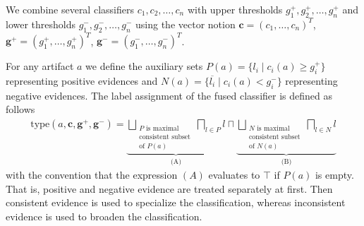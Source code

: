 

We combine several classifiers $c_1,c_2,\dots, c_n$ with upper thresholds $g_1^+, g_2^+, \dots, g_n^+$ and lower thresholds $g_1^-, g_2^-, \dots, g_n^-$ using the vector notion $\mathbf c = (c_1,\dots,c_n)^T$, $\mathbf g^+=(g_1^+,\dots, g_n^+)^T$, $\mathbf g^-=(g_1^-,\dots,g_n^-)^T$. 

For any artifact $a$ we define the auxiliary sets
$P(a) = \{l_i\mid c_i(a) \geq g_i^+\}$ representing positive evidences and
$N(a) = \{\overline{l_i}\mid c_i(a) < g_i^-\}$ representing negative evidences.
The label assignment of the fused classifier is defined as follows
\begin{gather*}
    \mathrm{type}(a,\mathbf c, \mathbf g^+,\mathbf g^-) = 
    \underbrace{
    \bigsqcup\limits_{\substack{\text{$P$ is maximal}\\\text{consistent subset}\\\text{of $P(a)$}}} \bigsqcap\limits_{l \in P} l}_{\text{(A)}}
    \sqcap
    \underbrace{
    \bigsqcup\limits_{\substack{\text{$N$ is maximal}\\\text{consistent subset}\\\text{of $N(a)$}}} \bigsqcap\limits_{l \in N} l}_{\text{(B)}}
\end{gather*}
with the convention that the expression $(A)$ evaluates to $\top$ if $P(a)$ is empty.
That is, positive and negative evidence are treated separately at first. 
Then consistent evidence is used to specialize the classification, whereas inconsistent evidence is used to broaden the classification.

